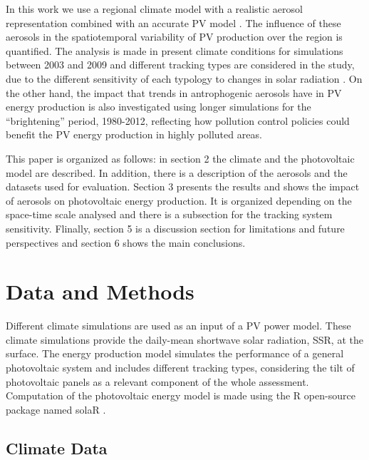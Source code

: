 In this work we use a regional climate model \citep{Nabat2014} with a realistic aerosol representation combined with an accurate PV model \citep{Lamigueiro2012}. The influence of these aerosols in the spatiotemporal variability of PV production over the region is quantified. The analysis is made in present climate conditions for simulations between 2003 and 2009 and different tracking types are considered in the study, due to the different sensitivity of each typology to changes in solar radiation \citep{Gutierrez2017}. On the other hand, the impact that trends in antrophogenic aerosols have in PV energy production is also investigated using longer simulations for the ``brightening'' \citep{Wild2005} period, 1980-2012, reflecting how pollution control policies could benefit the PV energy production in highly polluted areas.

This paper is organized as follows: in section 2 the climate and the photovoltaic model are described. In addition, there is a description of the aerosols and the datasets used for evaluation. Section 3 presents the results and shows the impact of aerosols on photovoltaic energy production. It is organized depending on the space-time scale analysed and there is a subsection for the tracking system sensitivity.  Flinally, section 5 is a discussion section for limitations and future perspectives and section 6 shows the main conclusions.

\section{Data and Methods}

Different climate simulations are used as an input of a PV power model. These climate simulations provide the daily-mean shortwave solar radiation, SSR, at the surface. The energy production model simulates the performance of a general photovoltaic system and includes different tracking types, considering the tilt of photovoltaic panels as a relevant component of the whole assessment. Computation of the photovoltaic energy model is made using the R open-source package named solaR \citep{Lamigueiro2012}.

\subsection{Climate Data}

